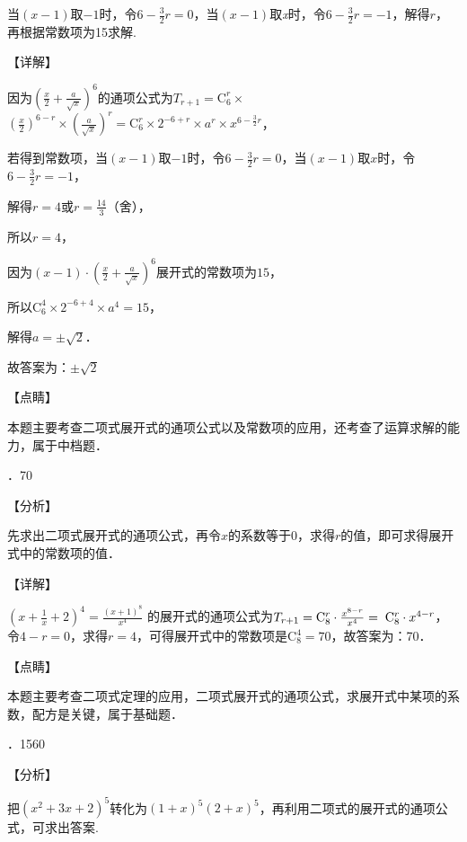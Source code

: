 \noindent 当$(x-1)$取$-1$时，令$6-\frac{3}{2} r=0$，当$(x-1)$取\textit{x}时，令$6-\frac{3}{2} r=-1$，解得$r$，再根据常数项为15求解.

\noindent 【详解】

\noindent 因为$\left(\frac{x}{2} +\frac{a}{\sqrt{x} } \right)^{6} $的通项公式为$T_{r+1} =\mathrm C_{6}^{r} \times $$\left(\frac{x}{2} \right)^{6-r} \times \left(\frac{a}{\sqrt{x} } \right)^{r} =\mathrm C_{6}^{r} \times 2^{-6+r} \times a^{r} \times x^{6-\frac{3}{2} r} $，

\noindent 若得到常数项，当$(x-1)$取$-1$时，令$6-\frac{3}{2} r=0$，当$(x-1)$取$x$时，令$6-\frac{3}{2} r=-1$，

\noindent 解得$r=4$或$r=\frac{14}{3} $（舍），

\noindent 所以$r=4$，

\noindent 因为$(x-1)\cdot \left(\frac{x}{2} +\frac{a}{\sqrt{x} } \right)^{6} $展开式的常数项为$15$，

\noindent 所以$\mathrm C_{6}^{4} \times 2^{-6+4} \times a^{4} =15$，

\noindent 解得$a=\pm \sqrt{2} $．

\noindent 故答案为：$\pm \sqrt{2} $

\noindent 【点睛】

\noindent 本题主要考查二项式展开式的通项公式以及常数项的应用，还考查了运算求解的能力，属于中档题．

．70

\noindent 【分析】

\noindent 先求出二项式展开式的通项公式，再令$x$的系数等于$0$，求得$r$的值，即可求得展开式中的常数项的值．

\noindent 【详解】

\noindent $\left(x+\frac{1}{x} +2\right)^{4} =\frac{\left(x+1\right)^{8} }{x^{4} } $ 的展开式的通项公式为$T_{r+1} =\mathrm C_{8}^{r} \cdot \frac{x^{8-r} }{x^{4} } ={\rm \; }\mathrm C_{8}^{r} \cdot x^{4-r} $， 令$4-r=0$，求得$r=4$，可得展开式中的常数项是$\mathrm C_{8}^{4} =70$，故答案为：70．

\noindent 【点睛】

\noindent 本题主要考查二项式定理的应用，二项式展开式的通项公式，求展开式中某项的系数，配方是关键，属于基础题．

．1560

\noindent 【分析】

\noindent 把$(x^{2} +3x+2)^{5} $转化为$\left(1+x\right)^{5} \left(2+x\right)^{5} $，再利用二项式的展开式的通项公式，可求出答案.

